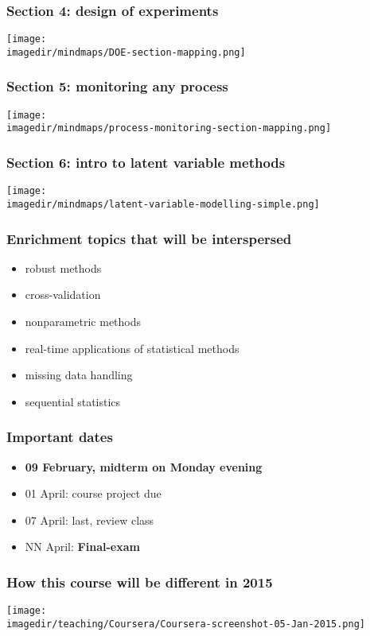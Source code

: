\begin{frame}\frametitle{Section 4: design of experiments}

	\texttt{[image: \\imagedir/mindmaps/DOE-section-mapping.png]}
\end{frame}

\begin{frame}\frametitle{Section 5: monitoring any process}
	\texttt{[image: \\imagedir/mindmaps/process-monitoring-section-mapping.png]}
\end{frame}

\begin{frame}\frametitle{Section 6: intro to latent variable methods}

	\texttt{[image: \\imagedir/mindmaps/latent-variable-modelling-simple.png]}
\end{frame}

\begin{frame}\frametitle{Enrichment topics that will be interspersed}
	\begin{itemize}
		\item	robust methods
		\item	cross-validation
		\item	nonparametric methods
		\item	real-time applications of statistical methods
		\item	missing data handling
		\item	sequential statistics
	\end{itemize}
\end{frame}

\begin{frame}\frametitle{Important dates}
	\begin{itemize}
		\item	{\color{myRed} \textbf{09 February, midterm on Monday evening}} \\{\color{myOrange}{Notify me of clashes this week!}}
		\item	01 April: course project due
		\item	07 April: last, review class
		\item	NN April: \textbf{Final-exam}
	\end{itemize}
\end{frame}

\begin{frame}\frametitle{How this course will be different in 2015}
	\centerline{\texttt{[image: \\imagedir/teaching/Coursera/Coursera-screenshot-05-Jan-2015.png]}}
\end{frame}


